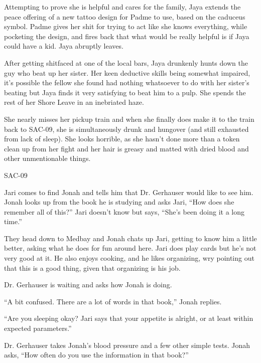 Attempting to prove she is helpful and cares for the family, Jaya extends the peace offering of a new tattoo design for Padme to use, based on the caduceus symbol.  Padme gives her shit for trying to act like she knows everything, while pocketing the design, and fires back that what would be really helpful is if Jaya could have a kid.  Jaya abruptly leaves.



After getting shitfaced at one of the local bars, Jaya drunkenly hunts down the guy who beat up her sister.  Her keen deductive skills being somewhat impaired, it's possible the fellow she found had nothing whatsoever to do with her sister's beating but Jaya finds it very satisfying to beat him to a pulp.  She spends the rest of her Shore Leave in an inebriated haze.



She nearly misses her pickup train and when she finally does make it to the train back to SAC-09, she is simultaneously drunk and hungover (and still exhausted from lack of sleep).  She looks horrible, as she hasn't done more than a token clean up from her fight and her hair is greasy and matted with dried blood and other unmentionable things.



 {\LARGE SAC-09 } 



Jari comes to find Jonah and tells him that Dr. Gerhauser would like to see him.  Jonah looks up from the book he is studying and asks Jari, ``How does she remember all of this?''  Jari doesn't know but says, ``She's been doing it a long time.''



They head down to Medbay and Jonah chats up Jari, getting to know him a little better, asking what he does for fun around here.  Jari does play cards but he's not very good at it.  He also enjoys cooking, and he likes organizing, wry pointing out that this is a good thing, given that organizing is his job.



Dr. Gerhauser is waiting and asks how Jonah is doing.  

``A bit confused.  There are a lot of words in that book,'' Jonah replies.

``Are you sleeping okay?  Jari says that your appetite is alright, or at least within expected parameters.''

Dr. Gerhauser takes Jonah's blood pressure and a few other simple tests.  Jonah asks, ``How often do you use the information in that book?''

